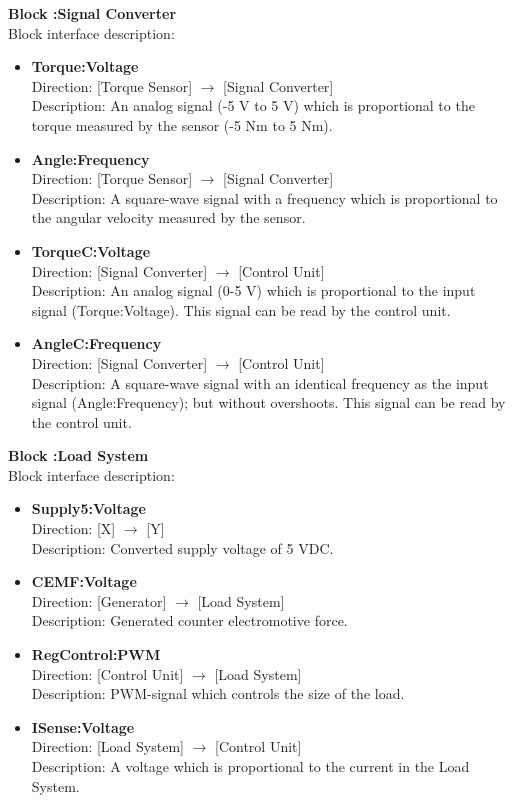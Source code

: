 \textbf{Block :Signal Converter}\\
Block interface description:
\begin{itemize}
	\item \textbf{Torque:Voltage}\\
	Direction: [Torque Sensor] $\rightarrow$ [Signal Converter]\\
	Description: An analog signal (-5 V to 5 V) which is proportional to the torque measured by the sensor (-5 Nm to 5 Nm).
	\item \textbf{Angle:Frequency}\\
	Direction: [Torque Sensor] $\rightarrow$ [Signal Converter]\\
	Description: A square-wave signal with a frequency which is proportional to the angular velocity measured by the sensor.
	\item \textbf{TorqueC:Voltage}\\
	Direction: [Signal Converter] $\rightarrow$ [Control Unit]\\
	Description: An analog signal (0-5 V) which is proportional to the input signal (Torque:Voltage). This signal can be read by the control unit.
	\item \textbf{AngleC:Frequency}\\
	Direction: [Signal Converter] $\rightarrow$ [Control Unit]\\
	Description: A square-wave signal with an identical frequency as the input signal (Angle:Frequency); but without overshoots. This signal can be read by the control unit.
\end{itemize}
							
\textbf{Block :Load System}\\
Block interface description:
\begin{itemize}
	\item \textbf{Supply5:Voltage}\\
	Direction: [X] $\rightarrow$ [Y]\\
	Description: Converted supply voltage of 5 VDC.
	\item \textbf{CEMF:Voltage}\\
	Direction: [Generator] $\rightarrow$ [Load System]\\
	Description: Generated counter electromotive force.
	\item \textbf{RegControl:PWM}\\
	Direction: [Control Unit] $\rightarrow$ [Load System]\\
	Description: PWM-signal which controls the size of the load.
	\item \textbf{ISense:Voltage}\\
	Direction: [Load System] $\rightarrow$ [Control Unit]\\
	Description: A voltage which is proportional to the current in the Load System.
\end{itemize}
								

